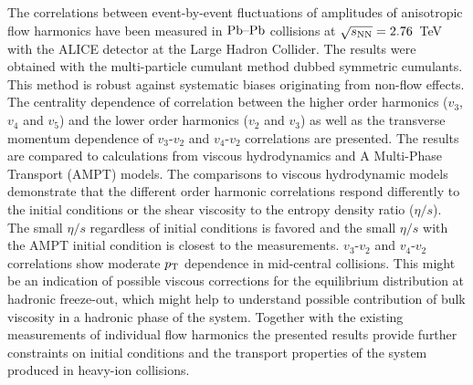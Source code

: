 The correlations between event-by-event fluctuations of amplitudes of anisotropic flow harmonics 
have been measured in $\textnormal{Pb--Pb}$ collisions at $\sqrt{s_{\textnormal{NN}}}=2.76$~TeV with the ALICE detector at the Large Hadron Collider. 
The results were obtained with the multi-particle cumulant method dubbed symmetric cumulants.
This method is robust against systematic biases originating from non-flow effects. 
The centrality dependence of correlation between the higher order harmonics ($v_3$, $v_4$ and $v_5$) and the lower order harmonics ($v_2$ and $v_3$) as well as the transverse momentum dependence of $v_3$-$v_2$ and $v_4$-$v_2$ correlations are presented. 
The results are compared to calculations from viscous hydrodynamics and  A Multi-Phase Transport ({AMPT}) models.
The comparisons to viscous hydrodynamic models demonstrate that
the different order harmonic correlations respond differently to the initial conditions or the shear viscosity to the entropy density ratio ($\eta/s$). The small $\eta/s$ regardless of initial conditions is favored and the small $\eta/s$ with the AMPT initial condition is closest to the measurements. 
$v_3$-$v_2$ and $v_4$-$v_2$ correlations show moderate $p_{\rm T}$ dependence in mid-central collisions. This might be an indication of possible viscous corrections for the equilibrium distribution at hadronic freeze-out, which might help to understand possible contribution of bulk viscosity in a hadronic phase of the system.
Together with the existing measurements of individual flow harmonics the presented results provide further constraints 
on initial conditions and the transport properties of the system produced in heavy-ion collisions.
